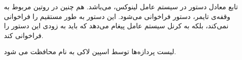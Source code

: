 تابع معادل دستور
در سیستم عامل لینوکس،
می‌باشد. هم چنین در روتین مربوط به وقفه‌ی تایمر، دستور
فراخوانی می‌شود. این دستور به طور مستقیم
را فراخوانی نمی‌کند، بلکه به کرنل سیستم عامل پیغام می‌دهد که باید به زودی این دستور را فراخوانی کند.

لیست پردازه‌ها توسط اسپین لاکی به نام
محافظت می شود.